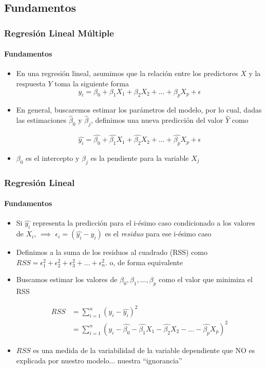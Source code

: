 \documentclass{beamer}
\begin{document}
\subsection{Fundamentos}
\begin{frame}
	\frametitle{Regresión Lineal Múltiple}
	\framesubtitle{Fundamentos}
	\begin{itemize}
		\item{En una regresión lineal, asumimos que la relación entre los predictores $X$ y la respuesta $Y$ toma la siguiente forma}
		\begin{equation}
			y_{i} = \beta_{0} + \beta_{1}X_{1} + \beta_{2}X_{2} +...+ \beta_{p}X_{p} + \epsilon
		\end{equation}
		
		\item{En general, buscaremos estimar los parámetros del modelo, por lo cual, dadas las estimaciones $\hat{\beta}_{0}$ y $\hat{\beta}_{j}$, definimos una nueva predicción del valor $\hat{Y}$ como}
		
		\begin{equation}
		\hat{y_{i}} = \hat{\beta_{0}} + \hat{\beta_{1}}X_{1} + \hat{\beta_{2}}X_{2} +...+ \hat{\beta_{p}}X_{p} + \epsilon
		\end{equation}
		
		\item{$\beta_{0}$ es el intercepto y $\beta_{j}$ es la pendiente para la variable $X_{j}$}
		\end{itemize}
\end{frame}

\begin{frame}
	\frametitle{Regresión Lineal}
	\framesubtitle{Fundamentos}
	\begin{itemize}
		\item{Si $\hat{y_{i}}$ representa la predicción para el i-ésimo caso condicionado a los valores de $X_{i}$, $\implies$ $\epsilon_{i} = (\hat{y_{i}} - y_{i})$ es el \emph{residuo} para ese i-ésimo caso}
		\item{Definimos a la suma de los residuos al cuadrado (RSS) como $RSS = \epsilon_{1}^2 + \epsilon_{2}^2 + \epsilon_{3}^2 + ... + \epsilon_{n}^2$. o, de forma equivalente}
	
		\item{Buscamos estimar los valores de $\beta_{0}, \beta_{1}, ..., \beta_{p}$ como el valor que minimiza el RSS}	
		
		\begin{equation}
			\begin{aligned}
			RSS & = \sum_{i=1}^{n}(y_{i} - \hat{y_{i}})^2 \\
		    & =  \sum_{i=1}^{n}(y_{i} - \hat{\beta_{0}} - \hat{\beta_{1}}X_{1} - \hat{\beta_{2}}X_{2} - ... - \hat{\beta_{p}}X_{p})^2 
			\end{aligned}
		\end{equation}
		\item{$RSS$ es una medida de la variabilidad de la variable dependiente que NO es explicada por nuestro modelo... nuestra ``ignorancia''}
	\end{itemize}
\end{frame}
\end{document}

